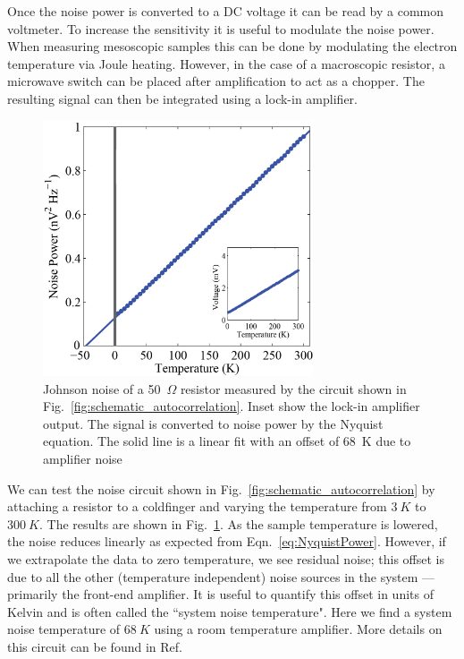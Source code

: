 Once the noise power is converted to a DC voltage it can be read by a common voltmeter. To increase the sensitivity it is useful to modulate the noise power. When measuring mesoscopic samples this can be done by modulating the electron temperature via Joule heating. However, in the case of a macroscopic resistor, a microwave switch can be placed after amplification to act as a chopper. The resulting signal can then be integrated using a lock-in amplifier.
\begin{figure}
\centering
\includegraphics[width = 80mm]{figures/Johnson_noise_thermometry/Auto_noise_vs_T.png}
\caption{Johnson noise of a 50~$\Omega$ resistor measured by the circuit shown in Fig.~\ref{fig:schematic_autocorrelation}. Inset show the lock-in amplifier output. The signal is converted to noise power by the Nyquist equation. The solid line is a linear fit with an offset of 68~K due to amplifier noise}
\label{fig:auto_noise_vs_T}
\end{figure}

We can test the noise circuit shown in Fig.~\ref{fig:schematic_autocorrelation} by attaching a resistor to a coldfinger and varying the temperature from $3~K$ to $300~K$. The results are shown in Fig.~\ref{fig:auto_noise_vs_T}. As the sample temperature is lowered, the noise reduces linearly as expected from Eqn.~\ref{eq:NyquistPower}. However, if we extrapolate the data to zero temperature, we see residual noise; this offset is due to all the other (temperature independent) noise sources in the system --- primarily the front-end amplifier. It is useful to quantify this offset in units of Kelvin and is often called the ``system noise temperature". Here we find a system noise temperature of $68~K$ using a room temperature amplifier.
More details on this circuit can be found in Ref.~\cite{crossno_development_2015}

